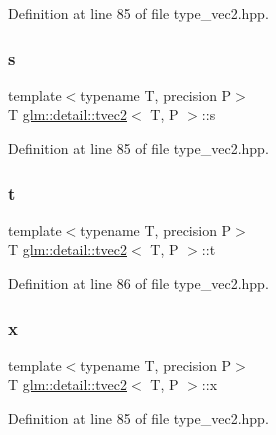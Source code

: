 Definition at line 85 of file type\+\_\+vec2.\+hpp.

\mbox{\label{structglm_1_1detail_1_1tvec2_a6d602cf7c31b75396944d828ad2aea72}} 
\subsubsection{\texorpdfstring{s}{s}}
{\footnotesize\ttfamily template$<$typename T, precision P$>$ \\
T \hyperlink{structglm_1_1detail_1_1tvec2}{glm\+::detail\+::tvec2}$<$ T, P $>$\+::s}



Definition at line 85 of file type\+\_\+vec2.\+hpp.

\mbox{\label{structglm_1_1detail_1_1tvec2_a3bc5274a5a076043a6c972c6806bd203}} 
\subsubsection{\texorpdfstring{t}{t}}
{\footnotesize\ttfamily template$<$typename T, precision P$>$ \\
T \hyperlink{structglm_1_1detail_1_1tvec2}{glm\+::detail\+::tvec2}$<$ T, P $>$\+::t}



Definition at line 86 of file type\+\_\+vec2.\+hpp.

\mbox{\label{structglm_1_1detail_1_1tvec2_a8eaf23d68c8d88949166dc2f641d19ba}} 
\subsubsection{\texorpdfstring{x}{x}}
{\footnotesize\ttfamily template$<$typename T, precision P$>$ \\
T \hyperlink{structglm_1_1detail_1_1tvec2}{glm\+::detail\+::tvec2}$<$ T, P $>$\+::x}



Definition at line 85 of file type\+\_\+vec2.\+hpp.

